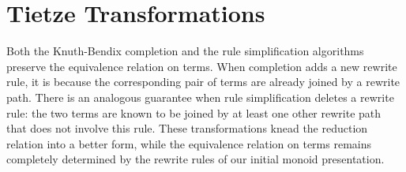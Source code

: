 \documentclass[../generics]{subfiles}
\begin{document}
\section{Tietze Transformations}\label{tietze transformations}

Both the Knuth-Bendix completion and the rule simplification algorithms preserve the equivalence relation on terms. When completion adds a new rewrite rule, it is because the corresponding pair of terms are already joined by a rewrite path. There is an analogous guarantee when rule simplification deletes a rewrite rule: the two terms are known to be joined by at least one other rewrite path that does not involve this rule. These transformations knead the reduction relation into a better form, while the equivalence relation on terms remains completely determined by the rewrite rules of our initial monoid presentation.
\end{document}
